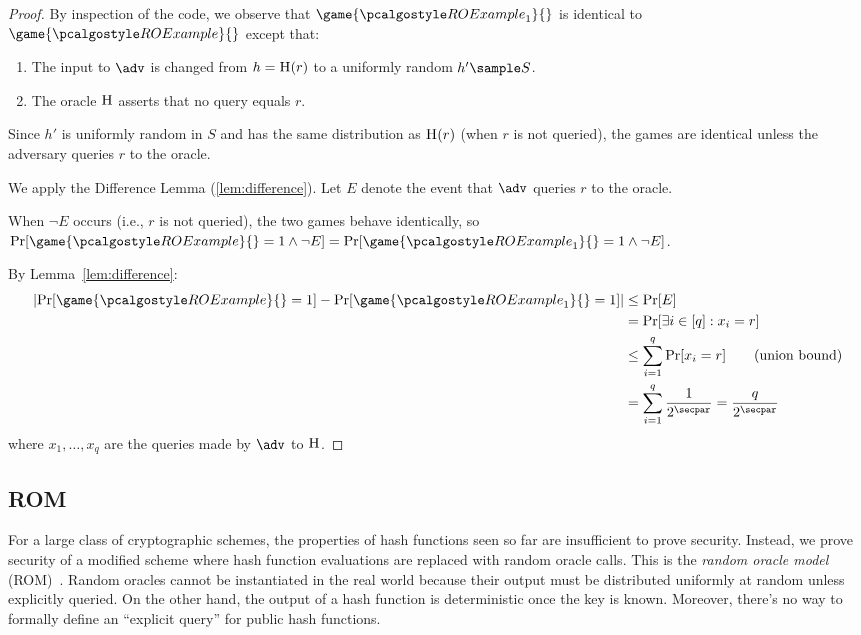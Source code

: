 \begin{proof}
  By inspection of the code, we observe that $\game{\algo{ROExample}_1}{}$ is identical to $\game{\algo{ROExample}}{}$ except that:
  \begin{enumerate}
  \item The input to $\adv$ is changed from $h = {\normalfont\textsc{H}}(r)$ to a uniformly random $h' \sample S$.
  \item The oracle ${\normalfont\textsc{H}}$ asserts that no query equals $r$.
  \end{enumerate}
  
  Since $h'$ is uniformly random in $S$ and has the same distribution as ${\normalfont\textsc{H}}(r)$ (when $r$ is not queried), the games are identical unless the adversary queries $r$ to the oracle.
  
  We apply the Difference Lemma (\autoref{lem:difference}).
  Let $E$ denote the event that $\adv$ queries $r$ to the oracle.
  
  When $\neg E$ occurs (i.e., $r$ is not queried), the two games behave identically, so $\Pr[\game{\algo{ROExample}}{} = 1 \wedge \neg E] = \Pr[\game{\algo{ROExample}_1}{} = 1 \wedge \neg E]$. 
  
  By Lemma~\ref{lem:difference}:
  \begin{align*}
    \left|\Pr[\game{\algo{ROExample}}{} = 1] - \Pr[\game{\algo{ROExample}_1}{} = 1]\right| &\leq \Pr[E] \\
    &= \Pr[\exists i \in [q] : x_i = r] \\
    &\leq \sum_{i=1}^q \Pr[x_i = r] \tag{union bound} \\
    &= \sum_{i=1}^q \frac{1}{2^\secpar} = \frac{q}{2^\secpar}
  \end{align*}
  where $x_1, \ldots, x_q$ are the queries made by $\adv$ to ${\normalfont\textsc{H}}$.
\end{proof}

\subsection{ROM}

  For a large class of cryptographic schemes, the properties of hash functions seen so far are insufficient to prove security.
  Instead, we prove security of a modified scheme where hash function evaluations are replaced with random oracle calls.
  This is the \emph{random oracle model} (ROM)~\cite{CCS:BelRog93}.
  Random oracles cannot be instantiated in the real world because their output must be distributed uniformly at random unless explicitly queried.
  On the other hand, the output of a hash function is deterministic once the key is known.
  Moreover, there's no way to formally define an ``explicit query'' for public hash functions.

